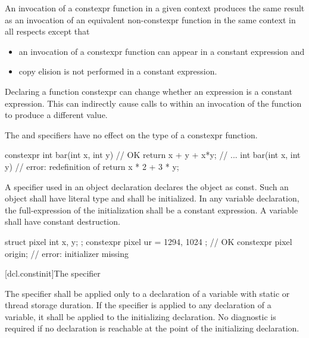 \pnum
An invocation of a constexpr function in a given context
produces the same result as
an invocation of an equivalent non-constexpr function in the same context
in all respects except that
\begin{itemize}
\item
an invocation of a constexpr function
can appear in a constant expression and
\item
copy elision is not performed in a constant expression.
\end{itemize}
\begin{note}
Declaring a function constexpr can change whether an expression
is a constant expression.
This can indirectly cause calls to 
within an invocation of the function to produce a different value.
\end{note}

\pnum
The  and  specifiers have no
effect on the type of a constexpr function.
\begin{example}
\begin{codeblock}
constexpr int bar(int x, int y)         // OK
    { return x + y + x*y; }
// ...
int bar(int x, int y)                   // error: redefinition of 
    { return x * 2 + 3 * y; }
\end{codeblock}
\end{example}

\pnum
A  specifier used in an object declaration
declares the object as const.
Such an object
shall have literal type and
shall be initialized.
In any  variable declaration,
the full-expression of the initialization
shall be a constant expression.
A  variable shall have constant destruction.
\begin{example}
\begin{codeblock}
struct pixel {
  int x, y;
};
constexpr pixel ur = { 1294, 1024 };    // OK
constexpr pixel origin;                 // error: initializer missing
\end{codeblock}
\end{example}

[dcl.constinit]{The  specifier}

\pnum
The  specifier shall be applied only
to a declaration of a variable with static or thread storage duration.
If the specifier is applied to any declaration of a variable,
it shall be applied to the initializing declaration.
No diagnostic is required if no  declaration
is reachable at the point of the initializing declaration.

